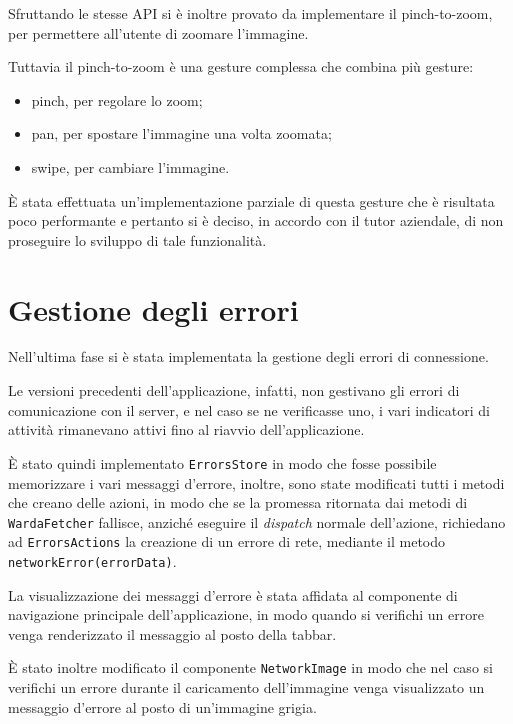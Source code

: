 Sfruttando le stesse API si è inoltre provato da implementare il pinch-to-zoom, per permettere all'utente di zoomare l'immagine.

Tuttavia il pinch-to-zoom è una gesture complessa che combina più gesture:
\begin{itemize}
\item pinch, per regolare lo zoom;
\item pan, per spostare l'immagine una volta zoomata;
\item swipe, per cambiare l'immagine.
\end{itemize}

\`E stata effettuata un'implementazione parziale di questa gesture che è risultata poco performante e pertanto si è deciso, in accordo con il tutor aziendale, di non proseguire lo sviluppo di tale funzionalità.

\section{Gestione degli errori}

Nell'ultima fase si è stata implementata la gestione degli errori di connessione.

Le versioni precedenti dell'applicazione, infatti, non gestivano gli errori di comunicazione con il server, e nel caso se ne verificasse uno, i vari indicatori di attività rimanevano attivi fino al riavvio dell'applicazione.

\`E stato quindi implementato \texttt{ErrorsStore} in modo che fosse possibile memorizzare i vari messaggi d'errore, inoltre, sono state modificati tutti i metodi che creano delle azioni, in modo che se la promessa ritornata dai metodi di \texttt{WardaFetcher} fallisce, anziché eseguire il \textit{dispatch} normale dell'azione, richiedano ad \texttt{ErrorsActions} la creazione di un errore di rete, mediante il metodo \texttt{networkError(errorData)}.

La visualizzazione dei messaggi d'errore è stata affidata al componente di navigazione principale dell'applicazione, in modo quando si verifichi un errore venga renderizzato il messaggio al posto della tabbar.

\`E stato inoltre modificato il componente \texttt{NetworkImage} in modo che nel caso si verifichi un errore durante il caricamento dell'immagine venga visualizzato un messaggio d'errore al posto di un'immagine grigia.
